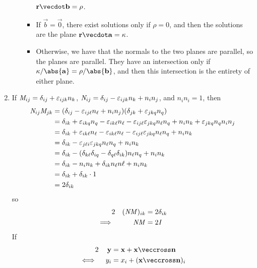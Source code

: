 \documentclass[fleqn,a4paper,11pt]{article}
\begin{document}
\begin{enumerate}[label=\textbf{\arabic*.}]
\begin{enumerate}[label=(\alph*)]
\begin{itemize}
       \(\vec r \vecdot \vec b = \rho\).
      \item
       If \(\vec b = \vec 0\), there exist solutions only if
       \(\rho = 0\), and then the solutions are the plane
       \(\vec r \vecdot \vec a = \kappa\).
      \item
       Otherwise, we have that the normals to the two planes are parallel, so
       the planes are parallel. They have an intersection only if
       \(\kappa / \abs{\vec a} = \rho / \abs{\vec b}\), and then this
       intersection is the entirety of either plane.
     \end{itemize}
   \end{enumerate}
  \item
   If \(\mathit{M}_{ij} = \delta_{ij} + \varepsilon_{ijk} n_k\),
   \(\mathit{N}_{ij} = \delta_{ij} - \varepsilon_{ijk} n_k + n_i n_j\), and
   \(n_i n_i = 1\), then
   \begin{align*}
    \mathit{N}_{ij} \mathit{M}_{jk}
     &= (\delta_{ij} - \varepsilon_{ij\ell} n_\ell + n_i n_j)
        (\delta_{jk} + \varepsilon_{jkq} n_q) \\
     &= \delta_{ik} + \varepsilon_{ikq} n_q
        - \varepsilon_{ik\ell} n_\ell
        - \varepsilon_{ij\ell} \varepsilon_{jkq} n_\ell n_q
        + n_i n_k + \varepsilon_{jkq} n_q n_i n_j \\
     &= \delta_{ik} + \varepsilon_{ik\ell} n_\ell
        - \varepsilon_{ik\ell} n_\ell
        - \varepsilon_{ij\ell} \varepsilon_{jkq} n_\ell n_q
        + n_i n_k \\
     &= \delta_{ik}
        - \varepsilon_{j\ell i} \varepsilon_{jkq} n_\ell n_q
        + n_i n_k \\
     &= \delta_{ik}
        - (\delta_{k\ell}\delta_{iq} - \delta_{q\ell}\delta_{ik}) n_\ell n_q
        + n_i n_k \\
     &= \delta_{ik}
        - n_i n_k + \delta_{ik} n_\ell n\ell
        + n_i n_k \\
     &= \delta_{ik}
        + \delta_{ik} \cdot 1 \\
     &= 2\delta_{ik}
   \end{align*}
   so
   \begin{alignat*}2
    && (\mat N \mat M)_{ik} &= 2\delta_{ik} \\
    \implies{}&& \mat N \mat M &= 2\mat I
   \end{alignat*}
   If
   \begin{alignat*}2
    && \vec y &= \vec x + \vec x \veccross \vec n \\
    \iff{}&& y_i &= x_i + (\vec x \veccross \vec n)_i \\

\end{alignat*}
\end{enumerate}
\end{document}
